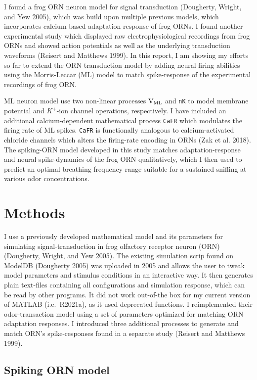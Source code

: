 \documentclass[
]{article}
\begin{document}
I found a frog ORN neuron model for signal transduction (Dougherty, Wright, and Yew 2005), which was build upon multiple previous models, which incorporates calcium based adaptation response of frog ORNs. I found another experimental study which displayed raw electrophysiological recordings from frog ORNs and showed action potentials as well as the underlying transduction waveforms (Reisert and Matthews 1999). In this report, I am showing my efforts so far to extend the ORN transduction model by adding neural firing abilities using the Morris-Leccar (ML) model to match spike-response of the experimental recordings of frog ORN.

ML neuron model use two non-linear processes \(\rm V_{ML}\) and \texttt{nK} to model membrane potential and \(K^+\)-ion channel operations, respectively. I have included an additional calcium-dependent mathematical process \texttt{CaFR} which modulates the firing rate of ML spikes. \texttt{CaFR} is functionally analogous to calcium-activated chloride channels which alters the firing-rate encoding in ORNs (Zak et al. 2018). The spiking-ORN model developed in this study matches adaptation-response and neural spike-dynamics of the frog ORN qualitatively, which I then used to predict an optimal breathing frequency range suitable for a sustained sniffing at various odor concentrations.

\hypertarget{methods}{%
\section{Methods}\label{methods}}

I use a previously developed mathematical model and its parameters for simulating signal-transduction in frog olfactory receptor neuron (ORN) (Dougherty, Wright, and Yew 2005). The existing simulation scrip found on ModelDB (Dougherty 2005) was uploaded in 2005 and allows the user to tweak model parameters and stimulus conditions in an interactive way. It then generates plain text-files containing all configurations and simulation response, which can be read by other programs. It did not work out-of-the box for my current version of MATLAB (i.e.~R2021a), as it used deprecated functions. I reimplemented their odor-transaction model using a set of parameters optimized for matching ORN adaptation responses. I introduced three additional processes to generate and match ORN's spike-responses found in a separate study (Reisert and Matthews 1999).

\hypertarget{spiking-orn-model}{%
\subsection{Spiking ORN model}\label{spiking-orn-model}}
\end{document}
